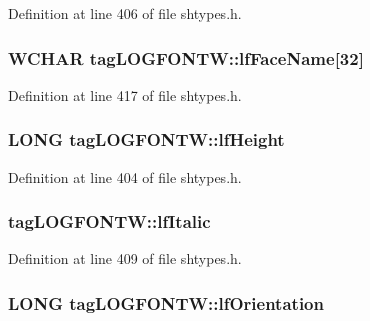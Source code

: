 Definition at line 406 of file shtypes.\+h.

\subsubsection[{\texorpdfstring{lf\+Face\+Name}{lfFaceName}}]{\setlength{\rightskip}{0pt plus 5cm}W\+C\+H\+AR tag\+L\+O\+G\+F\+O\+N\+T\+W\+::lf\+Face\+Name\mbox{[}32\mbox{]}}\hypertarget{structtag_l_o_g_f_o_n_t_w_a5c5f1aae8d18fa9f9f88913b80279015}{}\label{structtag_l_o_g_f_o_n_t_w_a5c5f1aae8d18fa9f9f88913b80279015}


Definition at line 417 of file shtypes.\+h.

\subsubsection[{\texorpdfstring{lf\+Height}{lfHeight}}]{\setlength{\rightskip}{0pt plus 5cm}L\+O\+NG tag\+L\+O\+G\+F\+O\+N\+T\+W\+::lf\+Height}\hypertarget{structtag_l_o_g_f_o_n_t_w_a9c49cb0a3c45762492bb4137e6c14eb5}{}\label{structtag_l_o_g_f_o_n_t_w_a9c49cb0a3c45762492bb4137e6c14eb5}


Definition at line 404 of file shtypes.\+h.

\subsubsection[{\texorpdfstring{lf\+Italic}{lfItalic}}]{ tag\+L\+O\+G\+F\+O\+N\+T\+W\+::lf\+Italic}\hypertarget{structtag_l_o_g_f_o_n_t_w_abb5b796d6d143e542469733c9787d591}{}\label{structtag_l_o_g_f_o_n_t_w_abb5b796d6d143e542469733c9787d591}


Definition at line 409 of file shtypes.\+h.

\subsubsection[{\texorpdfstring{lf\+Orientation}{lfOrientation}}]{\setlength{\rightskip}{0pt plus 5cm}L\+O\+NG tag\+L\+O\+G\+F\+O\+N\+T\+W\+::lf\+Orientation}\hypertarget{structtag_l_o_g_f_o_n_t_w_a905c539bcf06ab8276db51106160ca61}{}\label{structtag_l_o_g_f_o_n_t_w_a905c539bcf06ab8276db51106160ca61}


